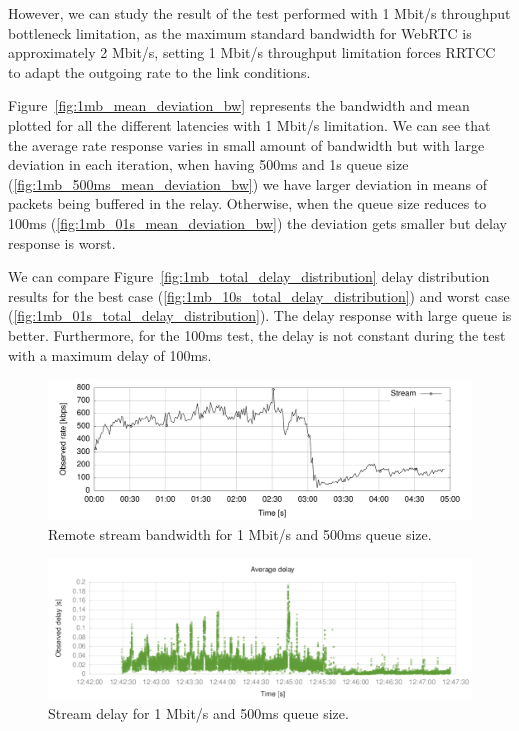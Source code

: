 However, we can study the result of the test performed with 1 Mbit/s throughput bottleneck limitation, as the maximum standard bandwidth for WebRTC is approximately 2 Mbit/s, setting 1 Mbit/s throughput limitation forces RRTCC to adapt the outgoing rate to the link conditions.

Figure~\ref{fig:1mb_mean_deviation_bw} represents the bandwidth and mean plotted for all the different latencies with 1 Mbit/s limitation. We can see that the average rate response varies in small amount of bandwidth but with large deviation in each iteration, when having 500ms and 1s queue size (\ref{fig:1mb_500ms_mean_deviation_bw}) we have larger deviation in means of packets being buffered in the relay. Otherwise, when the queue size reduces to 100ms (\ref{fig:1mb_01s_mean_deviation_bw}) the deviation gets smaller but delay response is worst.

We can compare Figure~\ref{fig:1mb_total_delay_distribution} delay distribution results for the best case (\ref{fig:1mb_10s_total_delay_distribution}) and worst case (\ref{fig:1mb_01s_total_delay_distribution}). The delay response with large queue is better. Furthermore, for the 100ms test, the delay is not constant during the test with a maximum delay of 100ms.

 \begin{figure}[h]
  \centering
    \includegraphics[width=1\textwidth]{./figures/1cd81aa8-bw.pdf}
      \caption[Remote stream bandwidth for 1 Mbit/s and 500ms queue size]{Remote stream bandwidth for 1 Mbit/s and 500ms queue size.}
	\label{fig:1cd81aa8-bw}
\end{figure}

 \begin{figure}[h]
  \centering
    \includegraphics[width=1\textwidth]{./figures/1cd81aa8-delay.pdf}
      \caption[Stream delay for 1 Mbit/s and 500ms queue size]{Stream delay for 1 Mbit/s and 500ms queue size.}
	\label{fig:1cd81aa8-delay}
\end{figure}

